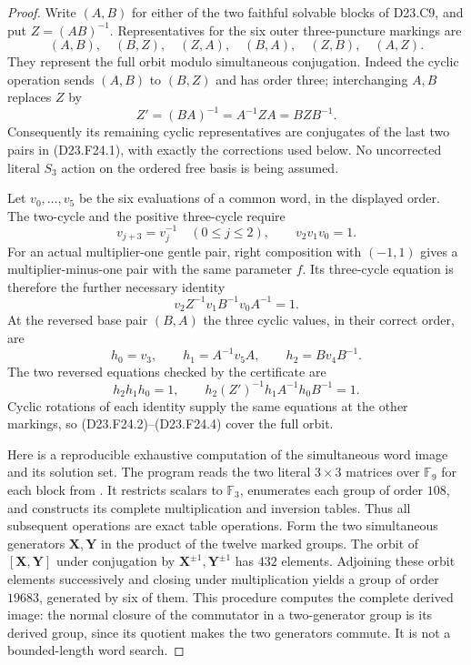 \begin{proof}
Write $(A,B)$ for either of the two faithful solvable blocks of
D23.C9, and put $Z=(AB)^{-1}$.  Representatives for the six outer
three-puncture markings are
\[
 (A,B),\quad (B,Z),\quad (Z,A),\quad
 (B,A),\quad (Z,B),\quad (A,Z).
\tag{D23.F24.1}
\]
They represent the full orbit modulo simultaneous conjugation.
Indeed the cyclic operation sends $(A,B)$ to $(B,Z)$ and has order
three; interchanging $A,B$ replaces $Z$ by
\[
 Z'=(BA)^{-1}=A^{-1}ZA=BZB^{-1}.
\]
Consequently its remaining cyclic representatives are conjugates of
the last two pairs in (D23.F24.1), with exactly the corrections used
below.  No uncorrected literal $S_3$ action on the ordered free basis
is being assumed.

Let $v_0,\ldots,v_5$ be the six evaluations of a common word, in the
displayed order.  The two-cycle and the positive three-cycle require
\[
 v_{j+3}=v_j^{-1}\quad(0\leq j\leq2),\qquad
                    v_2v_1v_0=1.
\tag{D23.F24.2}
\]
For an actual multiplier-one gentle pair, right composition with
$(-1,1)$ gives a multiplier-minus-one pair with the same parameter
$f$.  Its three-cycle equation is therefore the further necessary
identity
\[
                  v_2Z^{-1}v_1B^{-1}v_0A^{-1}=1.
\tag{D23.F24.3}
\]
At the reversed base pair $(B,A)$ the three cyclic values, in their
correct order, are
\[
 h_0=v_3,\qquad h_1=A^{-1}v_5A,\qquad
 h_2=Bv_4B^{-1}.
\]
The two reversed equations checked by the certificate are
\[
 h_2h_1h_0=1,\qquad
 h_2(Z')^{-1}h_1A^{-1}h_0B^{-1}=1.
\tag{D23.F24.4}
\]
Cyclic rotations of each identity supply the same equations at the
other markings, so (D23.F24.2)--(D23.F24.4) cover the full orbit.

Here is a reproducible exhaustive computation of the simultaneous
word image and its solution set.  The program
 reads the two
literal $3\times3$ matrices over $\mathbb F_9$ for each block from
.
It restricts scalars to $\mathbb F_3$, enumerates each group of order
$108$, and constructs its complete multiplication and inversion
tables.  Thus all subsequent operations are exact table operations.
Form the two simultaneous generators $\mathbf X,\mathbf Y$ in the
product of the twelve marked groups.  The orbit of
$[\mathbf X,\mathbf Y]$ under conjugation by
$\mathbf X^{\pm1},\mathbf Y^{\pm1}$ has $432$ elements.
Adjoining these orbit elements successively and closing under
multiplication yields a group of order $19683$, generated by six
of them.  This procedure computes the complete derived image:
the normal closure of the commutator in a two-generator group is
its derived group, since its quotient makes the two generators
commute.  It is not a bounded-length word search.


\end{proof}
